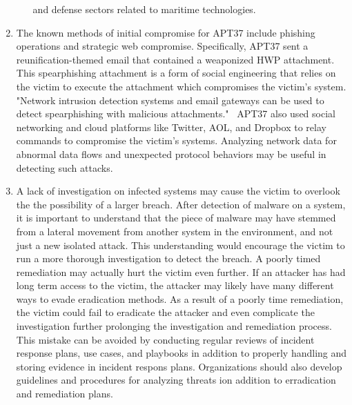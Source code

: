 \documentclass[11pt]{article}
\begin{document}
\begin{enumerate}
\begin{itemize}
    and defense sectors related to maritime technologies.
  \end{itemize}
  \item The known methods of initial compromise for APT37 include phishing operations
  and strategic web compromise.
  Specifically, APT37 sent a reunification-themed email that contained a weaponized HWP attachment.
  This spearphishing attachment is a form of social engineering that relies on the victim
  to execute the attachment which compromises the victim's system. "Network intrusion detection
  systems and email gateways can be used to detect spearphishing with malicious attachments."~\cite{phishing}
  APT37 also used social networking and cloud platforms like Twitter, AOL, and Dropbox to relay
  commands to compromise the victim's systems. Analyzing network data for abnormal data flows and
  unexpected protocol behaviors may be useful in detecting such attacks.~\cite{web-service}
  \item A lack of investigation on infected systems may cause the victim to overlook the
  the possibility of a larger breach. After detection of malware on a system, it is important
  to understand that the piece of malware may have stemmed from a lateral movement from
  another system in the environment, and not just a new isolated attack. This understanding would
  encourage the victim to run a more thorough investigation to detect the breach.
  A poorly timed remediation may actually hurt the victim even further. If an attacker has had
  long term access to the victim, the attacker may likely have many different ways to evade eradication
  methods. As a result of a poorly time remediation, the victim could fail to eradicate the attacker
  and even complicate the investigation further prolonging the investigation and remediation process.
  This mistake can be avoided by conducting regular reviews of incident response plans, use cases,
  and playbooks in addition to properly handling and storing evidence in incident respons plans.
  Organizations should also develop guidelines and procedures for analyzing threats ion addition to
  erradication and remediation plans.
\end{enumerate}
\end{document}
